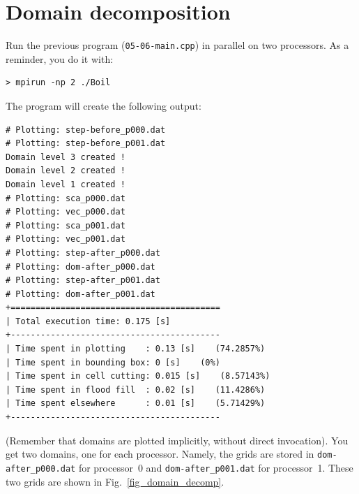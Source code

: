\section{Domain decomposition}
\label{sec_decomposition}

Run the previous program ({\tt 05-06-main.cpp}) in parallel on two processors. 
As a reminder, you do it with:
%
\begin{verbatim}
> mpirun -np 2 ./Boil
\end{verbatim}
%
The program will create the following output:
%
{\small \begin{verbatim}
# Plotting: step-before_p000.dat
# Plotting: step-before_p001.dat
Domain level 3 created !
Domain level 2 created !
Domain level 1 created !
# Plotting: sca_p000.dat
# Plotting: vec_p000.dat
# Plotting: sca_p001.dat
# Plotting: vec_p001.dat
# Plotting: step-after_p000.dat
# Plotting: dom-after_p000.dat
# Plotting: step-after_p001.dat
# Plotting: dom-after_p001.dat
+==========================================
| Total execution time: 0.175 [s]
+------------------------------------------
| Time spent in plotting    : 0.13 [s]    (74.2857%)
| Time spent in bounding box: 0 [s]    (0%)
| Time spent in cell cutting: 0.015 [s]    (8.57143%)
| Time spent in flood fill  : 0.02 [s]    (11.4286%)
| Time spent elsewhere      : 0.01 [s]    (5.71429%)
+------------------------------------------
\end{verbatim}}
%
(Remember that domains are plotted implicitly, without direct invocation).
You get two domains, one for each processor. Namely, the grids are stored
in {\tt dom-after\_p000.dat} for processor~0 and {\tt dom-after\_p001.dat}
for processor~1. These two grids are shown in Fig.~\ref{fig_domain_decomp}.

